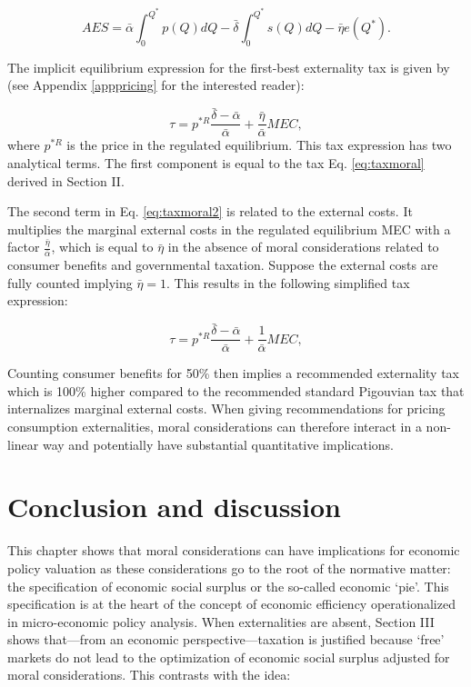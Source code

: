\documentclass[
]{book}
\begin{document}
\begin{equation}
  AES = \bar{\alpha} \int_0^{Q^*} p(Q)dQ - \bar{\delta} \int_0^{Q^*} s(Q) dQ - \bar{\eta} e(Q^*).
  \label{eq:adjsocsur2}
\end{equation}

The implicit equilibrium expression for the first-best externality tax is given by (see Appendix \ref{apppricing} for the interested reader):

\begin{equation}
 \tau = p^{*R} \frac{\bar{\delta} - \bar{\alpha}}{\bar{\alpha}} + \frac{\bar{\eta}}{\bar{\alpha}}MEC,
   \label{eq:taxmoral2}
\end{equation}
where \(p^{*R}\) is the price in the regulated equilibrium. This tax expression has two analytical terms. The first component is equal to the tax Eq. \eqref{eq:taxmoral} derived in Section II.

The second term in Eq. \eqref{eq:taxmoral2} is related to the external costs. It multiplies the marginal external costs in the regulated equilibrium MEC with a factor \(\frac{\bar{\eta}}{\bar{\alpha}}\), which is equal to \(\bar{\eta}\) in the absence of moral considerations related to consumer benefits and governmental taxation. Suppose the external costs are fully counted implying \(\bar{\eta} = 1\). This results in the following simplified tax expression:

\begin{equation}
 \tau = p^{*R} \frac{\bar{\delta} - \bar{\alpha}}{\bar{\alpha}} + \frac{1}{\bar{\alpha}}MEC,
   \label{eq:taxmoral3}
\end{equation}

Counting consumer benefits for 50\% then implies a recommended externality tax which is 100\% higher compared to the recommended standard Pigouvian tax that internalizes marginal external costs. When giving recommendations for pricing consumption externalities, moral considerations can therefore interact in a non-linear way and potentially have substantial quantitative implications.

\hypertarget{conclusion-and-discussion}{%
\section{Conclusion and discussion}\label{conclusion-and-discussion}}

This chapter shows that moral considerations can have implications for economic policy valuation as these considerations go to the root of the normative matter: the specification of economic social surplus or the so-called economic `pie'. This specification is at the heart of the concept of economic efficiency operationalized in micro-economic policy analysis. When externalities are absent, Section III shows that---from an economic perspective---taxation is justified because `free' markets do not lead to the optimization of economic social surplus adjusted for moral considerations. This contrasts with the idea:
\end{document}
